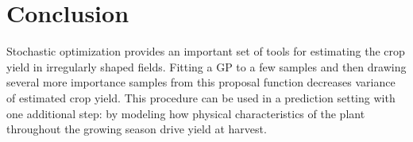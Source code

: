 \documentclass{article} %
\begin{document}
\section{Conclusion}
Stochastic optimization provides an important set of tools for estimating the crop yield in irregularly shaped fields. Fitting a GP to a few samples and then drawing several more importance samples from this proposal function decreases variance of estimated crop yield. This procedure can be used in a prediction setting with one additional step: by modeling how physical characteristics of the plant throughout the growing season drive yield at harvest.



\end{document}
